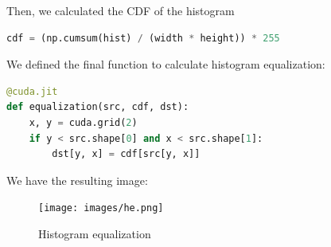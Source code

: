 \documentclass[12pt]{article}
\begin{document}
\noindent
Then, we calculated the CDF of the histogram
\begin{lstlisting}[language=Python]
cdf = (np.cumsum(hist) / (width * height)) * 255
\end{lstlisting}

\noindent
We defined the final function to calculate histogram equalization:

\begin{lstlisting}[language=Python]
@cuda.jit
def equalization(src, cdf, dst):
    x, y = cuda.grid(2)
    if y < src.shape[0] and x < src.shape[1]:
        dst[y, x] = cdf[src[y, x]]
\end{lstlisting}
\noindent
We have the resulting image:
\begin{figure}[H]
\centering
    \texttt{[image: images/he.png]}
    \caption{Histogram equalization}
\end{figure}
\end{document}
